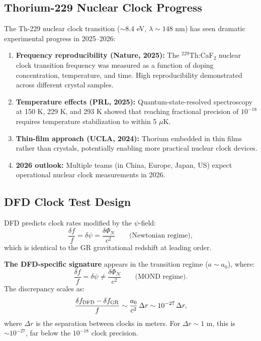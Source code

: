 \documentclass[11pt]{article}
\newcommand{\aM}{a_0}
\begin{document}
\subsection{Thorium-229 Nuclear Clock Progress}

The Th-229 nuclear clock transition ($\sim 8.4$ eV, $\lambda \sim 148$ nm)
has seen dramatic experimental progress in 2025--2026:

\begin{enumerate}
  \item \textbf{Frequency reproducibility (Nature, 2025):} The
    $^{229}$Th:CaF$_2$ nuclear clock transition frequency was measured
    as a function of doping concentration, temperature, and time.
    High reproducibility demonstrated across different crystal samples.
  \item \textbf{Temperature effects (PRL, 2025):} Quantum-state-resolved
    spectroscopy at 150 K, 229 K, and 293 K showed that reaching
    fractional precision of $10^{-18}$ requires temperature stabilization
    to within 5 $\mu$K.
  \item \textbf{Thin-film approach (UCLA, 2024):} Thorium embedded in
    thin films rather than crystals, potentially enabling more practical
    nuclear clock devices.
  \item \textbf{2026 outlook:} Multiple teams (in China, Europe, Japan,
    US) expect operational nuclear clock measurements in 2026.
\end{enumerate}

\subsection{DFD Clock Test Design}

DFD predicts clock rates modified by the $\psi$-field:
\begin{equation}
  \frac{\delta f}{f} = \delta\psi = \frac{\delta\Phi_N}{c^2}
  \qquad \text{(Newtonian regime)},
\end{equation}
which is identical to the GR gravitational redshift at leading order.

\textbf{The DFD-specific signature} appears in the transition regime
($a \sim \aM$), where:
\begin{equation}
  \frac{\delta f}{f} = \delta\psi \neq \frac{\delta\Phi_N}{c^2}
  \qquad \text{(MOND regime)}.
\end{equation}
The discrepancy scales as:
\begin{equation}
  \frac{\delta f_{\rm DFD} - \delta f_{\rm GR}}{f} \sim
  \frac{\aM}{c^2}\,\Delta r \sim 10^{-27}\,\Delta r,
\end{equation}
where $\Delta r$ is the separation between clocks in meters. For
$\Delta r \sim 1$ m, this is $\sim 10^{-27}$, far below the
$10^{-18}$ clock precision.
\end{document}
